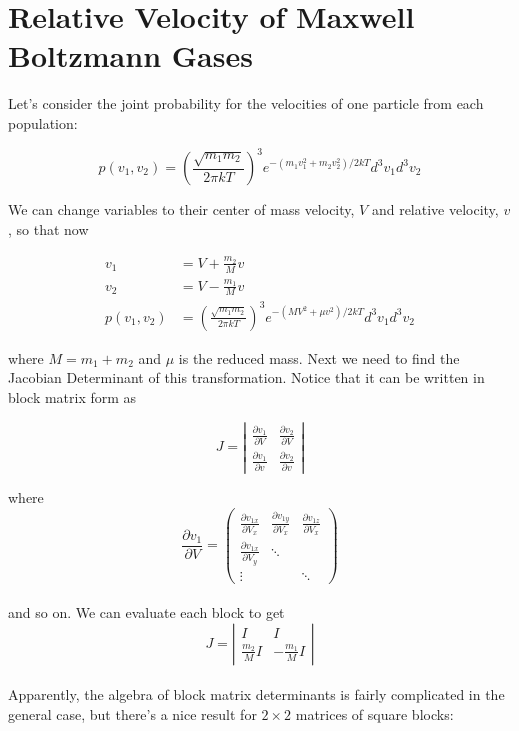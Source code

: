 \documentclass[12pt]{article}
\newcommand{\pfrac}[2]{\left(\frac{#1}{#2} \right)}
\newcommand{\pdiff}[2]{\frac{\partial#1}{\partial#2}}
\begin{document}
\section{Relative Velocity of Maxwell Boltzmann Gases}

Let's consider the joint probability for the velocities of one particle from each population:

\[ p(v_1,v_2) = \pfrac{\sqrt{m_1 m_2}}{2\pi kT}^3 e^{-(m_1 v_1^2 + m_2 v_2^2) / 2kT} d^3 v_1 d^3 v_2
\]

We can change variables to their center of mass velocity, \(V\) and relative velocity, \(v\), so that now

\begin{align*}
v_1 &= V + \frac{m_2}{M}v\\
v_2 &= V - \frac{m_1}{M}v\\
 p(v_1,v_2) &= \pfrac{\sqrt{m_1 m_2}}{2\pi kT}^3 e^{-(MV^2 + \mu v^2) / 2kT} d^3 v_1 d^3 v_2
\end{align*}

where \(M = m_1 + m_2\) and \(\mu\) is the reduced mass. Next we need to find the Jacobian Determinant of this transformation. Notice that it can be written in block matrix form as

\[ J = \left|  \begin{array}{cc} 
	\pdiff{v_1}{V} & \pdiff{v_2}{V} \\[11pt]
	\pdiff{v_1}{v} & \pdiff{v_2}{v}

\end{array} \right|
\]

where
\[ \pdiff{v_1}{V} = \left(\begin{array}{ccc}
	\pdiff{v_{1x}}{V_x} & \pdiff{v_{1y}}{V_x} & \pdiff{v_{1z}}{V_x} \\
	\pdiff{v_{1x}}{V_y} & \ddots &  \\
	\vdots & & \ddots
	
\end{array}\right)
\]\\

and so on. We can evaluate each block to get \\

\[ J = \left|  \begin{array}{cc} 
	I & I \\[11pt]
	\frac{m_2}{M}I & -\frac{m_1}{M}I 
\end{array} \right|
\]\\

Apparently, the algebra of block matrix determinants is fairly complicated in the general case, but there's a nice result for \(2\times 2\) matrices of square blocks:
\end{document}
